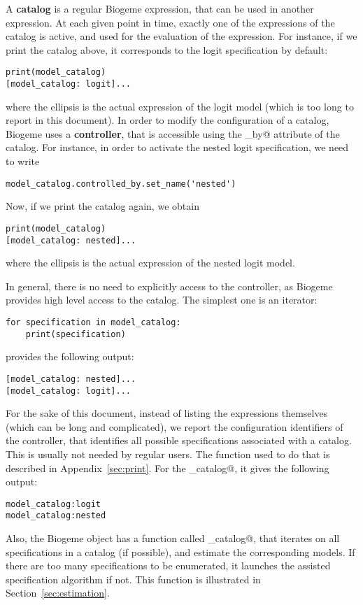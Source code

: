 \documentclass[12pt,a4paper]{article}
\begin{document}
A \textbf{catalog} is a regular Biogeme expression, that can be used
in another expression. At each given point in time, exactly one of the
expressions of the catalog is active, and used for the evaluation of
the expression. For instance, if we print the catalog above, it
corresponds to the logit specification by default:
\begin{lstlisting}
print(model_catalog)
[model_catalog: logit]...
\end{lstlisting}
where the ellipsis is the actual expression of the logit model (which is too long to report in this document). 
In order to modify the configuration of a catalog, Biogeme uses a
\textbf{controller}, that is accessible using the
\lstinline@controlled_by@ attribute of the catalog. For instance, in
order to activate the nested logit specification, we need to write
\begin{lstlisting}
model_catalog.controlled_by.set_name('nested')  
\end{lstlisting}
Now, if we print the catalog again, we obtain
\begin{lstlisting}
print(model_catalog)
[model_catalog: nested]...
\end{lstlisting}
where the ellipsis is the actual expression of the nested logit model. 

In general, there is no need to explicitly access to the controller,
as Biogeme provides high level access to the catalog. The simplest one
is an iterator:
\begin{lstlisting}
for specification in model_catalog:
    print(specification)
\end{lstlisting}
provides the following output:
\begin{lstlisting}
[model_catalog: nested]...
[model_catalog: logit]...
\end{lstlisting}
For the sake of this document, instead of listing the expressions themselves (which can be long and complicated), we report the configuration identifiers of the controller, that identifies all possible specifications associated with a catalog. This is usually not needed by regular users. The function used to do that is described in Appendix~\ref{sec:print}.
For the \lstinline@model_catalog@, it gives the following output:
\begin{lstlisting}
model_catalog:logit
model_catalog:nested
\end{lstlisting}
Also, the Biogeme object has a function called
\lstinline@estimate_catalog@, that iterates on all specifications in a
catalog (if possible), and estimate the corresponding models. If there
are too many specifications to be enumerated, it launches the assisted
specification algorithm if not. This function is illustrated in
Section~\ref{sec:estimation}.
\end{document}
